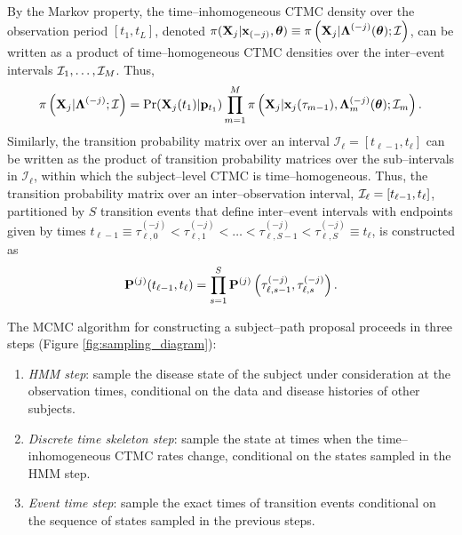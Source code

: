 By the Markov property, the time--inhomogeneous CTMC density over the observation period $ [t_1,t_L] $, denoted $ \pi(\mathbf{X}_j | \mathbf{x}_{(-j)}, \boldsymbol{\theta}) \equiv \pi\left (\mathbf{X}_j | \boldsymbol{\Lambda}^{(-j)}(\boldsymbol{\theta}); \mathcal{I}\right ) $, can be written as a product of time--homogeneous CTMC densities over the inter--event intervals $ \mathcal{I}_1,\dots,\mathcal{I}_{M} $. Thus,
\begin{equation}
\label{eqn:subj_level_dens}
\pi\left (\mathbf{X}_j | \boldsymbol{\Lambda}^{(-j)};\mathcal{I}\right ) = \Pr(\mathbf{X}_j(t_1) | \mathbf{p}_{t_1}) \prod_{m=1}^{M}\pi\left (\mathbf{X}_j  | \mathbf{x}_j(\tau_{m-1}), \boldsymbol{\Lambda}^{(-j)}_m(\boldsymbol{\theta});\mathcal{I}_m\right ).
\end{equation} 
Similarly, the transition probability matrix over an interval $ \mathcal{I}_\ell = [t_{\ell-1},t_\ell] $ can be written as the product of transition probability matrices over the sub--intervals in $ \mathcal{I}_\ell $, within which the subject--level CTMC is time--homogeneous. Thus, the transition probability matrix over an inter--observation interval, $ \mathcal{I}_\ell = [t_{\ell-1}, t_\ell] $, partitioned by $ S $ transition events that define inter--event intervals with endpoints given by times $ t_{\ell-1} \equiv \tau_{\ell,0}^{(-j)} < \tau_{\ell,1}^{(-j)}<\dots<\tau_{\ell,S-1}^{(-j)}  < \tau_{\ell,S}^{(-j)} \equiv t_\ell $, is constructed as
\begin{equation*}\label{eqn:inhomog_tpmprod} \mathbf{P}^{(j)}(t_{\ell - 1},t_\ell) = \prod_{s=1}^{S}\mathbf{P}^{(j)}\left(\tau_{\ell,s-1}^{(-j)},\tau_{\ell,s}^{(-j)}\right) .\end{equation*}

The MCMC algorithm for constructing a subject--path proposal proceeds in three steps (Figure \ref{fig:sampling_diagram}):  
\begin{enumerate}[nolistsep]
	\item \textit{HMM step}: sample the disease state of the subject under consideration at the observation times, conditional on the data and disease histories of other subjects.
	\item \textit{Discrete time skeleton step}: sample the state at times when the time--inhomogeneous CTMC rates change, conditional on the states sampled in the HMM step. 
	\item \textit{Event time step}: sample the exact times of transition events conditional on the sequence of states sampled in the previous steps. 
\end{enumerate}

